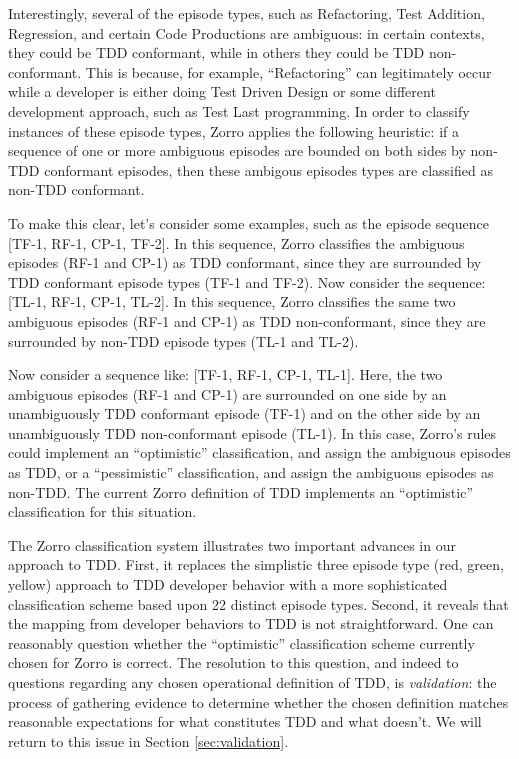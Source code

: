 \documentclass[11pt,twocolumn]{article}
\begin{document}
Interestingly, several of the episode types, such as Refactoring, Test
Addition, Regression, and certain Code Productions are ambiguous: in
certain contexts, they could be TDD conformant, while in others they could
be TDD non-conformant.  This is because, for example, ``Refactoring'' can
legitimately occur while a developer is either doing Test Driven Design or
some different development approach, such as Test Last programming.  In
order to classify instances of these episode types, Zorro applies the
following heuristic: if a sequence of one or more ambiguous episodes are
bounded on both sides by non-TDD conformant episodes, then these ambigous
episodes types are classified as non-TDD conformant.

To make this clear, let's consider some examples, such as the episode
sequence [TF-1, RF-1, CP-1, TF-2].  In this sequence, Zorro classifies the
ambiguous episodes (RF-1 and CP-1) as TDD conformant, since they are
surrounded by TDD conformant episode types (TF-1 and TF-2).  Now consider
the sequence: [TL-1, RF-1, CP-1, TL-2].  In this sequence, Zorro classifies
the same two ambiguous episodes (RF-1 and CP-1) as TDD non-conformant,
since they are surrounded by non-TDD episode types (TL-1 and TL-2).

Now consider a sequence like: [TF-1, RF-1, CP-1, TL-1].  Here, the two
ambiguous episodes (RF-1 and CP-1) are surrounded on one side by an
unambiguously TDD conformant episode (TF-1) and on the other side by an
unambiguously TDD non-conformant episode (TL-1).  In this case, Zorro's
rules could implement an ``optimistic'' classification, and assign the
ambiguous episodes as TDD, or a ``pessimistic'' classification, and assign
the ambiguous episodes as non-TDD.  The current Zorro definition of TDD
implements an ``optimistic'' classification for this situation.

The Zorro classification system illustrates two important advances in our
approach to TDD.  First, it replaces the simplistic three episode type
(red, green, yellow) approach to TDD developer behavior with a more
sophisticated classification scheme based upon 22 distinct episode
types. Second, it reveals that the mapping from developer behaviors to TDD
is not straightforward. One can reasonably question whether the
``optimistic'' classification scheme currently chosen for Zorro is correct.
The resolution to this question, and indeed to questions regarding any
chosen operational definition of TDD, is {\em validation}: the process of
gathering evidence to determine whether the chosen definition matches
reasonable expectations for what constitutes TDD and what doesn't. We will
return to this issue in Section \ref{sec:validation}.
\end{document}
